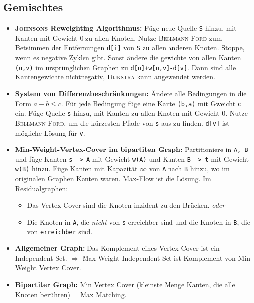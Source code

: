 \subsection{Gemischtes}
\begin{itemize}
	\item \textbf{\textsc{Johnsons} Reweighting Algorithmus:}
	Füge neue Quelle \lstinline{S} hinzu, mit Kanten mit Gewicht 0 zu allen Knoten.
	Nutze \textsc{Bellmann-Ford} zum Betsimmen der Entfernungen \lstinline{d[i]} von \lstinline{S} zu allen anderen Knoten.
	Stoppe, wenn es negative Zyklen gibt.
	Sonst ändere die gewichte von allen Kanten \lstinline{(u,v)} im ursprünglichen Graphen zu \lstinline{d[u]+w[u,v]-d[v]}.
	Dann sind alle Kantengewichte nichtnegativ, \textsc{Dijkstra} kann angewendet werden.

	\item \textbf{System von Differenzbeschränkungen:}
	Ändere alle Bedingungen in die Form $a-b \leq c$.
	Für jede Bedingung füge eine Kante \lstinline{(b,a)} mit Gweicht \lstinline{c} ein.
	Füge Quelle \lstinline{s} hinzu, mit Kanten zu allen Knoten mit Gewicht 0.
	Nutze \textsc{Bellmann-Ford}, um die kürzesten Pfade von \lstinline{s} aus zu finden.
	\lstinline{d[v]} ist mögliche Lösung für \lstinline{v}.

	\item \textbf{Min-Weight-Vertex-Cover im bipartiten Graph:}
	Partitioniere in \lstinline{A, B} und füge Kanten \lstinline{s -> A} mit Gewicht \lstinline{w(A)} und Kanten  \lstinline{B -> t} mit Gewicht \lstinline{w(B)} hinzu.
	Füge Kanten mit Kapazität $\infty$ von \lstinline{A} nach \lstinline{B} hinzu, wo im originalen Graphen Kanten waren.
	Max-Flow ist die Lösung.\newline
	Im Residualgraphen:
	\begin{itemize}[nosep]
		\item Das Vertex-Cover sind die Knoten inzident zu den Brücken. \emph{oder}
		\item Die Knoten in \lstinline{A}, die \emph{nicht} von \lstinline{s} erreichber sind und die Knoten in \lstinline{B}, die von \lstinline{erreichber} sind.
	\end{itemize}

	\item \textbf{Allgemeiner Graph:}
	Das Komplement eines Vertex-Cover ist ein Independent Set.
	$\Rightarrow$ Max Weight Independent Set ist Komplement von Min Weight Vertex Cover.

	\item \textbf{Bipartiter Graph:}
	Min Vertex Cover (kleinste Menge Kanten, die alle Knoten berühren) = Max Matching.


\end{itemize}
